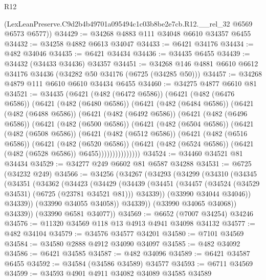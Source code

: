 \begin{lexlean}{R12}
\begin{coremodule}
      (LexLeanPreserve.C9d2b4b49701a095494c1c03b8be2e7cb.R12.__rel_32 @6569 @6573 @6577))
@34429 := @34268 @4883 @111 @34048 @6610 @34357 @6455
@34432 := @34258 @4882 @6613 @34047
@34433 := @6421 @34176
@34434 := @482 @34046
@34435 := @6421 @34434
@34436 := @34435 @6455
@34439 := @34432 (@34433 @34436) @34357
@34451 := @34268 @146 @4881 @6610 @6612 @34176 @34436 (@34282 @50 @34176 (@6725 (@34285 @50)))
@34457 := @34268 @4879 @111 @6610 @6610 @34434 @6455
@34460 := @34275 @4877 @6610 @81
@34521 := @34435
    (@6421
      (@482 (@6472 @6586))
      (@6421
        (@482 (@6476 @6586))
        (@6421
          (@482 (@6480 @6586))
          (@6421
            (@482 (@6484 @6586))
            (@6421
              (@482 (@6488 @6586))
              (@6421
                (@482 (@6492 @6586))
                (@6421
                  (@482 (@6496 @6586))
                  (@6421
                    (@482 (@6500 @6586))
                    (@6421
                      (@482 (@6504 @6586))
                      (@6421
                        (@482 (@6508 @6586))
                        (@6421
                          (@482 (@6512 @6586))
                          (@6421
                            (@482 (@6516 @6586))
                            (@6421
                              (@482 (@6520 @6586))
                              (@6421
                                (@482 (@6524 @6586))
                                (@6421 (@482 (@6528 @6586)) @6455)))))))))))))))
@34524 := @34460 @34521 @81 @34434
@34529 := @34277 @249 @6602 @81 @6587 @34288
@34531 := @6725 (@34232 @249)
@34566 := @34256
    (@34267
      (@34293
        (@34299
          (@34310
            (@34345
              (@34351
                (@34362
                  (@34423
                    (@34429
                      (@34439
                        (@34451
                          (@34457 (@34524 (@34529 @34531) (@6725 (@23781 @34521 @81))) @34339))
                        (@33990 @34044 @34046))
                      @34339))
                  (@33990 @34055 @34058))
                @34339))
            (@33990 @34065 @34068))
          @34339))
      (@33990 @6581 @34077))
@34569 := @6652 (@7007 @34254) @34246
@34576 := @11320 @34569 @118 @13 @4913 @4941 @34098 @34132
@34577 := @482 @34104
@34579 := @34576 @34577 @34201
@34580 := @7101 @34569
@34584 := @34580 @2888 @4912 @34090 @34097
@34585 := @482 @34092
@34586 := @6421 @34585
@34587 := @482 @34096
@34589 := @6421 @34587 @6455
@34592 := @34584 (@34586 @34589) @34577
@34593 := @6711 @34569
@34599 := @34593 @4901 @4911 @34082 @34089 @34585 @34589

\end{coremodule}
\end{lexlean}
